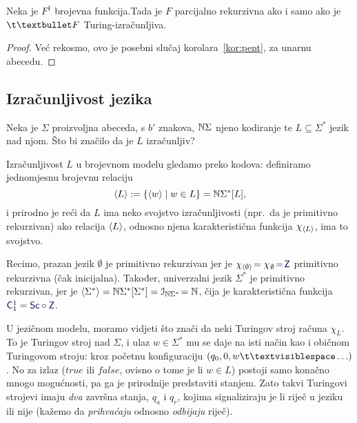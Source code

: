 \begin{korolar}[{name=[unarno reprezentirane brojevne funkcije u različitim modelima]}]\label{kor:peuf}
Neka je $F^1$ brojevna funkcija.\newline Tada je $F$ parcijalno rekurzivna ako i samo ako je $\t\textbullet F$ Turing-izračunljiva.
\end{korolar}
\begin{proof}
Već rekosmo, ovo je posebni slučaj korolara~\ref{kor:pent}, za unarnu abecedu.
\end{proof}

\subsection{Izračunljivost jezika}\label{sec:Todl}

Neka je $\Sigma$ proizvoljna abeceda, s $b'$ znakova, ${\mathbb N}\Sigma$ njeno kodiranje te $L\subseteq\Sigma^*$ jezik nad njom. Što bi značilo da je $L$ izračunljiv?

Izračunljivost $L$ u brojevnom modelu gledamo preko kodova: definiramo jednomjesnu brojevnu relaciju
\begin{equation}\label{eq:kodLdef}
    \langle L\rangle:=\{\langle w\rangle\mid w\in L\}={\mathbb N}\Sigma^*[L]\text,
\end{equation}
i prirodno je reći da $L$ ima neko svojstvo izračunljivosti (npr.\ da je primitivno rekurzivan) ako relacija $\langle L\rangle$, odnosno njena karakteristična funkcija $\chi_{\langle L\rangle}$, ima to svojstvo.

Recimo, prazan jezik $\emptyset$ je primitivno rekurzivan jer je $\chi_{\kr\emptyset}\!=\chi_{\mspace{1mu}\emptyset}\!=\!\f Z$ primitivno rekurzivna (čak inicijalna). Također, univerzalni jezik $\Sigma^*$ je primitivno rekurzivan, jer je $\langle\Sigma^*\rangle={\mathbb N}\Sigma^*[\Sigma^*]=\mathcal I_{{\mathbb N}\Sigma^*}\!={\mathbb N}$, čija je karakteristična funkcija $\f C_1^1=\f{Sc}\circ\f Z$.

U jezičnom modelu, moramo vidjeti što znači da neki Turingov stroj računa $\chi_L$. To je Turingov stroj nad $\Sigma$, i ulaz $w\in\Sigma^*$ mu se daje na isti način kao i običnom Turingovom stroju: kroz početnu konfiguraciju $(q_0,0,w\bl\ldots)$. No za izlaz ($\mathit{true}$ ili $\mathit{false}$, ovisno o tome je li $w\in L$) postoji samo konačno mnogo mogućnosti, pa ga je prirodnije predstaviti stanjem. Zato takvi Turingovi strojevi imaju \emph{dva} završna stanja, $q_a$ i $q_r$, kojima signaliziraju je li riječ u jeziku ili nije (kažemo da \emph{prihvaćaju} odnosno \emph{odbijaju} riječ).

